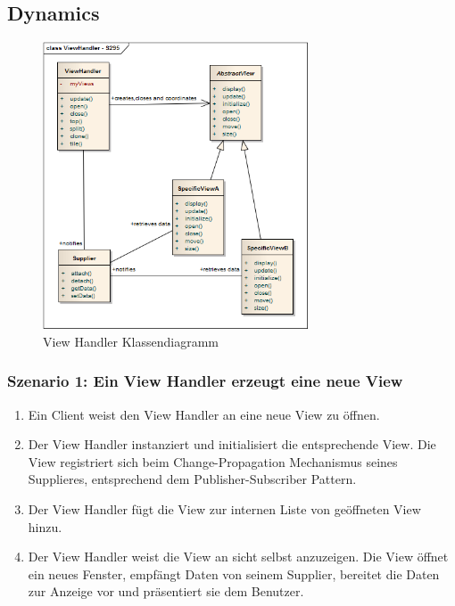 \subsection*{Dynamics}

\begin{figure}[H]
	\centering
	\includegraphics[width=0.7\textwidth]{content/posa1/images/view-handler-classes.png}
	\caption{View Handler Klassendiagramm}
\end{figure}

\subsubsection*{Szenario 1: Ein View Handler erzeugt eine neue View}

\begin{enumerate}
	\item Ein Client weist den View Handler an eine neue View zu öffnen.
	\item Der View Handler instanziert und initialisiert die entsprechende View. Die View registriert sich beim Change-Propagation Mechanismus seines Supplieres, entsprechend dem Publisher-Subscriber Pattern.
	\item Der View Handler fügt die View zur internen Liste von geöffneten View hinzu.
	\item Der View Handler weist die View an sicht selbst anzuzeigen. Die View öffnet ein neues Fenster, empfängt Daten von seinem Supplier, bereitet die Daten zur Anzeige vor und präsentiert sie dem Benutzer.
\end{enumerate}

